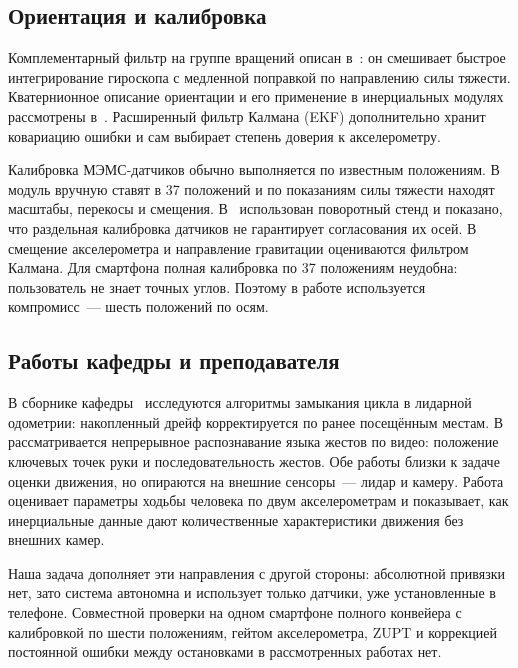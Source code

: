 \documentclass{misisarticle}
\begin{document}
\subsection{Ориентация и калибровка}

Комплементарный фильтр на группе вращений описан в~\cite{mahony}: он смешивает быстрое интегрирование гироскопа с медленной поправкой по направлению силы тяжести. Кватернионное описание ориентации и его применение в инерциальных модулях рассмотрены в~\cite{woodman}. Расширенный фильтр Калмана (EKF) дополнительно хранит ковариацию ошибки и сам выбирает степень доверия к акселерометру.

Калибровка МЭМС-датчиков обычно выполняется по известным положениям. В~\cite{tedaldi} модуль вручную ставят в 37 положений и по показаниям силы тяжести находят масштабы, перекосы и смещения. В~\cite{zhang} использован поворотный стенд и показано, что раздельная калибровка датчиков не гарантирует согласования их осей. В~\cite{batista} смещение акселерометра и направление гравитации оцениваются фильтром Калмана. Для смартфона полная калибровка по 37 положениям неудобна: пользователь не знает точных углов. Поэтому в работе используется компромисс~--- шесть положений по осям.

\subsection{Работы кафедры и преподавателя}

В сборнике кафедры~\cite{epifanov} исследуются алгоритмы замыкания цикла в лидарной одометрии: накопленный дрейф корректируется по ранее посещённым местам. В~\cite{vershinin} рассматривается непрерывное распознавание языка жестов по видео: положение ключевых точек руки и последовательность жестов. Обе работы близки к задаче оценки движения, но опираются на внешние сенсоры~--- лидар и камеру. Работа~\cite{kataev} оценивает параметры ходьбы человека по двум акселерометрам и показывает, как инерциальные данные дают количественные характеристики движения без внешних камер.

Наша задача дополняет эти направления с другой стороны: абсолютной привязки нет, зато система автономна и использует только датчики, уже установленные в телефоне. Совместной проверки на одном смартфоне полного конвейера с калибровкой по шести положениям, гейтом акселерометра, ZUPT и коррекцией постоянной ошибки между остановками в рассмотренных работах нет.

\end{document}
